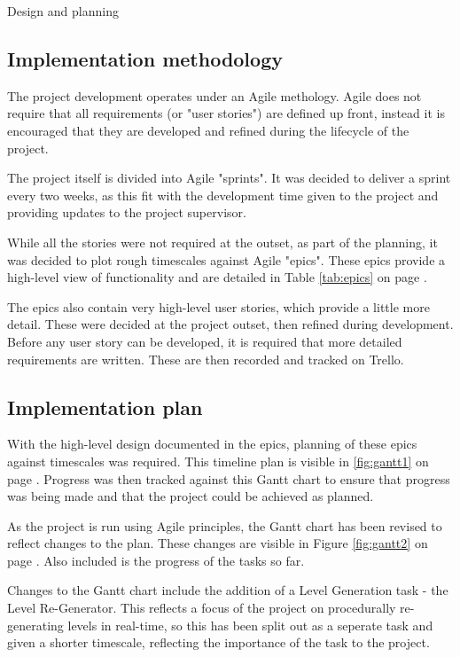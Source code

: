 \documentclass[progress]{cmpreport}
\begin{document}
\begin{section}{Design and planning}

\subsection{Implementation methodology}
The project development operates under an Agile methology. Agile does not require that all requirements (or "user stories") are defined up front, instead it is encouraged that they are developed and refined during the lifecycle of the project.

The project itself is divided into Agile "sprints". It was decided to deliver a sprint every two weeks, as this fit with the development time given to the project and providing updates to the project supervisor.

While all the stories were not required at the outset, as part of the planning, it was decided to plot rough timescales against Agile "epics". These epics provide a high-level view of functionality and are detailed in Table \ref{tab:epics} on page \pageref{tab:epics}.

The epics also contain very high-level user stories, which provide a little more detail. These were decided at the project outset, then refined during development. Before any user story can be developed, it is required that more detailed requirements are written. These are then recorded and tracked on Trello. 

\subsection{Implementation plan}

With the high-level design documented in the epics, planning of these epics against timescales was required. This timeline plan is visible in \ref{fig:gantt1} on page \pageref{fig:gantt1}. Progress was then tracked against this Gantt chart to ensure that progress was being made and that the project could be achieved as planned.

As the project is run using Agile principles, the Gantt chart has been revised to reflect changes to the plan. These changes are visible in Figure \ref{fig:gantt2} on page \pageref{fig:gantt2}. Also included is the progress of the tasks so far.

Changes to the Gantt chart include the addition of a Level Generation task - the Level Re-Generator. This reflects a focus of the project on procedurally re-generating levels in real-time, so this has been split out as a seperate task and given a shorter timescale, reflecting the importance of the task to the project.


\end{section}
\end{document}
